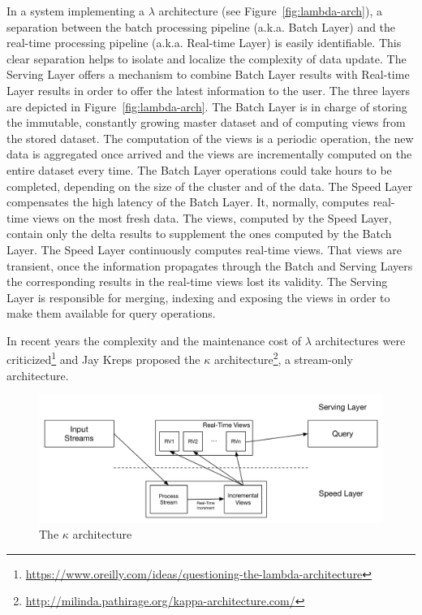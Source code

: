 In a system implementing a $\lambda$ architecture (see Figure~\ref{fig:lambda-arch}), a separation between the batch processing pipeline (a.k.a. Batch Layer) and the real-time processing pipeline (a.k.a. Real-time Layer) is easily identifiable. This clear separation helps to isolate and localize the complexity of data update. The Serving Layer offers a mechanism to combine Batch Layer results with Real-time Layer results in order to offer the latest information to the user. The three layers are depicted in Figure~\ref{fig:lambda-arch}.
The Batch Layer is in charge of storing the immutable, constantly growing master dataset and of computing views from the stored dataset. 
The computation of the views is a periodic operation, the new data is aggregated once arrived and the views are incrementally computed on the entire dataset every time.
The Batch Layer operations could take hours to be completed, depending on the size of the cluster and of the data.
The Speed Layer compensates the high latency of the Batch Layer. It, normally, computes real-time views on the most fresh data. The views, computed by the Speed Layer, contain only the delta results to supplement the ones computed by the Batch Layer.
The Speed Layer continuously computes real-time views. That views are transient, once the information propagates through the Batch and Serving Layers the corresponding results in the real-time views lost its validity.
The Serving Layer is responsible for merging, indexing and exposing the views in order to make them available for query operations.

In recent years the complexity and the maintenance cost of $\lambda$ architectures were criticized\footnote{\url{https://www.oreilly.com/ideas/questioning-the-lambda-architecture}} and Jay Kreps proposed the $\kappa$ architecture\footnote{\url{http://milinda.pathirage.org/kappa-architecture.com/}}, a stream-only architecture.

\begin{figure}[t]
  \begin{center}
    \includegraphics[width=\textwidth]{img/kappa-arch}
    \caption{The $\kappa$ architecture}
    \label{fig:kappa-arch}
  \end{center}
\end{figure}

